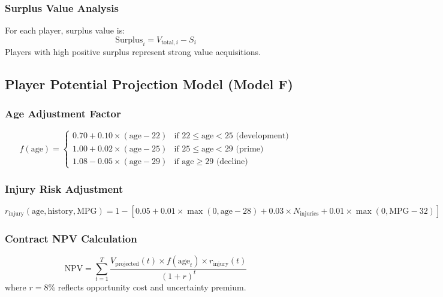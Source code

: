 \documentclass{mcmthesis}
\begin{document}
\subsubsection{Surplus Value Analysis}

For each player, surplus value is:
\begin{equation}
\text{Surplus}_i = V_{\text{total},i} - S_i
\end{equation}
Players with high positive surplus represent strong value acquisitions.

\subsection{Player Potential Projection Model (Model F)}

\subsubsection{Age Adjustment Factor}

\begin{equation}
f(\text{age}) = \begin{cases}
0.70 + 0.10 \times (\text{age}-22) & \text{if } 22 \leq \text{age} < 25 \text{ (development)} \\
1.00 + 0.02 \times (\text{age}-25) & \text{if } 25 \leq \text{age} < 29 \text{ (prime)} \\
1.08 - 0.05 \times (\text{age}-29) & \text{if } \text{age} \geq 29 \text{ (decline)}
\end{cases}
\end{equation}

\subsubsection{Injury Risk Adjustment}

\begin{equation}
r_{\text{injury}}(\text{age}, \text{history}, \text{MPG}) = 1 - \left[0.05 + 0.01 \times \max(0, \text{age}-28) + 0.03 \times N_{\text{injuries}} + 0.01 \times \max(0, \text{MPG}-32)\right]
\end{equation}

\subsubsection{Contract NPV Calculation}

\begin{equation}
\text{NPV} = \sum_{t=1}^{T} \frac{V_{\text{projected}}(t) \times f(\text{age}_t) \times r_{\text{injury}}(t)}{(1+r)^t}
\end{equation}
where $r = 8\%$ reflects opportunity cost and uncertainty premium.
\end{document}
